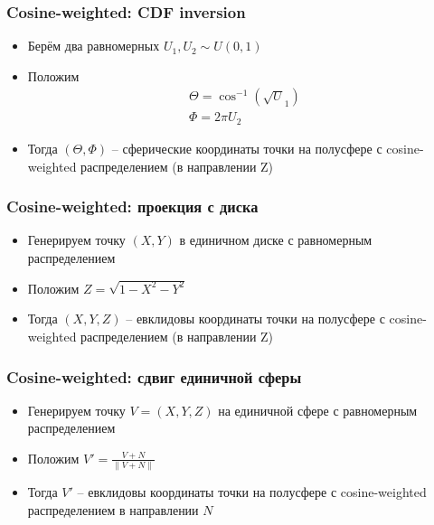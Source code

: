 \documentclass[handout,10pt]{beamer}
\begin{document}
\begin{frame}
\frametitle{Cosine-weighted: CDF inversion}
\begin{itemize}
\item Берём два равномерных \begin{math}U_1,U_2 \sim U(0,1)\end{math}
\pause
\item Положим
\begin{gather*}
\Theta = \cos^{-1}(\sqrt U_1) \\
\Phi = 2\pi U_2
\end{gather*}
\pause
\item Тогда \begin{math}(\Theta,\Phi)\end{math} -- сферические координаты точки на полусфере с cosine-weighted распределением (в направлении Z)
\end{itemize}
\end{frame}

\begin{frame}
\frametitle{Cosine-weighted: проекция с диска}
\begin{itemize}
\item Генерируем точку \begin{math}(X,Y)\end{math} в единичном диске с равномерным распределением
\pause
\item Положим \begin{math}Z = \sqrt{1 - X^2 - Y^2}\end{math}
\pause
\item Тогда \begin{math}(X,Y,Z)\end{math} -- евклидовы координаты точки на полусфере с cosine-weighted распределением (в направлении Z)
\end{itemize}
\end{frame}

\begin{frame}
\frametitle{Cosine-weighted: сдвиг единичной сферы}
\begin{itemize}
\item Генерируем точку \begin{math}V = (X,Y,Z)\end{math} на единичной сфере с равномерным распределением
\pause
\item Положим \begin{math}V' = \frac{V + N}{\|V + N\|}\end{math}
\pause
\item Тогда \begin{math}V'\end{math} -- евклидовы координаты точки на полусфере с cosine-weighted распределением в направлении \begin{math}N\end{math}
\end{itemize}
\end{frame}
\end{document}
